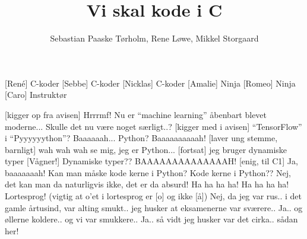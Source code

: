 \documentclass[a4paper,11pt]{article}
\title{Vi skal kode i C}
\author{Sebastian Paaske Tørholm, Rene Løwe, Mikkel Storgaard}
\begin{document}
\maketitle





\begin{roles}
[René] C-koder
[Sebbe] C-koder
[Nicklas] C-koder
[Amalie] Ninja
[Romeo] Ninja
[Caro] Instruktør
\end{roles}

\begin{sketch}


  [kigger op fra avisen] Hrrrmf! Nu er ``machine learning'' åbenbart
  blevet moderne... Skulle det nu være noget særligt..?
  [kigger med i avisen] ``TensorFlow'' i ``Pyyyyyython''? Baaaaaah...
   Python? Baaaaaaaaaah!
  [laver ung stemme, barnligt] wah wah wah se mig, jeg er Python...
  [fortsat] jeg bruger dynamiske typer
  [Vågner!] Dynamiske typer?? BAAAAAAAAAAAAAAH! 
  [enig, til C1] Ja, baaaaaaah!
  Kan man måske kode kerne i Python?
  Kode kerne i Python??
  Nej, det kan man da naturligvis ikke, det er da absurd! Ha ha ha ha!
   Ha ha ha ha!
   Lortesprog! (vigtig at o'et i lortesprog er [o] og ikke [å])
   Nej, da jeg var rus..  i det
  gamle årtusind, var alting smukt.. jeg husker at eksamenerne var sværere..
   Ja.. og øllerne koldere..
   og vi var smukkere..
   Ja.. så vidt jeg husker var det cirka.. sådan her!
\end{sketch}
\end{document}
